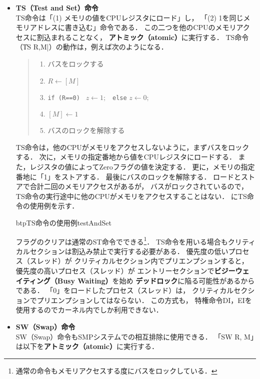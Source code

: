 \begin{itemize}
\item {\bf TS（Test and Set）命令} \\
TS命令は「(1) メモリの値をCPUレジスタにロード」し，
「(2) 1を同じメモリアドレスに書き込む」命令である．
この二つを他のCPUのメモリアクセスに割込まれることなく，
{\bf アトミック（atomic）}に実行する．
TS命令（\|TS R,M|）の動作は，例えば次のようになる．

\begin{quote}
\begin{enumerate}
\item バスをロックする
\item $R \leftarrow [M]$
\item {\tt if (R==0) } $z \leftarrow 1;$ {\tt ~else} $z \leftarrow 0;$
\item $[M] \leftarrow 1$
\item バスのロックを解除する
\end{enumerate}
\end{quote}

TS命令は，他のCPUがメモリをアクセスしないように，まずバスをロックする．
次に，メモリの指定番地から値をCPUレジスタにロードする．
また，レジスタの値によってZeroフラグの値を決定する．
更に，メモリの指定番地に「1」をストアする．
最後にバスのロックを解除する．
ロードとストアで合計二回のメモリアクセスがあるが，
バスがロックされているので，
TS命令の実行途中に他のCPUがメモリをアクセスすることはない．
にTS命令の使用例を示す．

\begin{myfig}{btp}{TS命令の使用例}{testAndSet}

\end{myfig}

フラグのクリアは通常のST命令でできる\footnote{
通常の命令もメモリアクセスする度にバスをロックしている．}．
TS命令を用いる場合もクリティカルセクションは割込み禁止で実行する必要がある．
優先度の低いプロセス（スレッド）が
クリティカルセクション内でプリエンプションすると，
優先度の高いプロセス（スレッド）が
エントリーセクションで{\bf ビジーウェイティング（Busy Waiting）}を始め
{\bf デッドロック}に陥る可能性があるからである．
「0」をロードしたプロセス（スレッド）は，
クリティカルセクションでプリエンプションしてはならない．
この方式も，
特権命令DI，EIを使用するのでカーネル内でしか利用できない．

\item {\bf SW（Swap）命令} \\
SW（Swap）命令もSMPシステムでの相互排除に使用できる．
「SW  R, M」は以下を{\bf アトミック（atomic）}に実行する．


\end{itemize}

